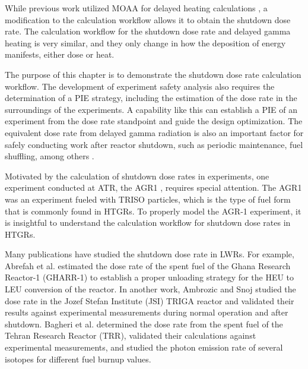 \label{ch:sdr}

While previous work utilized MOAA for delayed heating calculations \cite{fairhurst_decay_2022, fairhurst_demonstration_2022, fairhurst_database_2022}, a modification to the calculation workflow allows it to obtain the shutdown dose rate.
The calculation workflow for the shutdown dose rate and delayed gamma heating is very similar, and they only change in how the deposition of energy manifests, either dose or heat.

The purpose of this chapter is to demonstrate the shutdown dose rate calculation workflow.
The development of experiment safety analysis also requires the determination of a \gls*{PIE} strategy, including the estimation of the dose rate in the surroundings of the experiments.
A capability like this can establish a \gls*{PIE} of an experiment from the dose rate standpoint and guide the design optimization.
% 
The equivalent dose rate from delayed gamma radiation is also an important factor for safely conducting work after reactor shutdown, such as periodic maintenance, fuel shuffling, among others \cite{ho_calculation_2022}.

Motivated by the calculation of shutdown dose rates in experiments, one experiment conducted at \gls*{ATR}, the \gls*{AGR1} \cite{sterbentz_agr1_2018}, requires special attention.
The \gls*{AGR1} was an experiment fueled with \gls*{TRISO} particles, which is the type of fuel form that is commonly found in \glspl*{HTGR}.
To properly model the AGR-1 experiment, it is insightful to understand the calculation workflow for shutdown dose rates in \glspl*{HTGR}.

Many publications have studied the shutdown dose rate in \glspl*{LWR}.
%
For example, Abrefah et al. \cite{abrefah_estimation_2018} estimated the dose rate of the spent fuel of the Ghana Research Reactor-1 (GHARR-1) to establish a proper unloading strategy for the \gls*{HEU} to \gls*{LEU} conversion of the reactor.
%
In another work, Ambrozic and Snoj \cite{ambrozic_JSIR2S_2020} studied the dose rate in the Jozef Stefan Institute (JSI) TRIGA reactor and validated their results against experimental measurements during normal operation and after shutdown.
%
Bagheri et al. \cite{bagheri_gamma_2021} determined the dose rate from the spent fuel of the Tehran Research Reactor (TRR), validated their calculations against experimental measurements, and studied the photon emission rate of several isotopes for different fuel burnup values.

